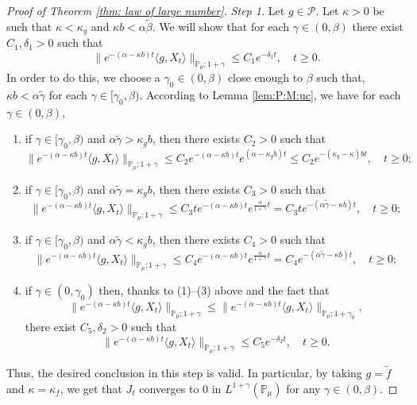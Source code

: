 \documentclass[12pt,a4paper]{amsart}
\theoremstyle{plain}
\theoremstyle{definition}
\numberwithin{equation}{section}
\begin{document}
\begin{proof}[Proof of Theorem \ref{thm: law of large number}]
\emph{Step 1.} Let $g\in \mathcal P$.
Let $\kappa > 0$ be such that $\kappa < \kappa_g$ and $\kappa b < \alpha \tilde \beta$.
We will show that for each $\gamma \in (0,\beta)$ there exist $C_1,\delta_1 > 0$ such that
\[
	\|e^{-(\alpha - \kappa b)t} \langle g, X_t\rangle\|_{\mathbb P_\mu;1+\gamma}
	\leq C_1 e^{-\delta_1 t},
	\quad t\geq 0.
\]
In order to do this, we choose a $\gamma_0 \in (0,\beta)$ close enough to $\beta$ such that, $\kappa b< \alpha \tilde \gamma$ for each $\gamma \in [\gamma_0, \beta)$.
According to Lemma \ref{lem:P:M:uc}, we have for each $\gamma \in (0,\beta)$,
\begin{enumerate}
\item
	if $\gamma \in [\gamma_0, \beta)$ and $\alpha\tilde \gamma> \kappa_g b$, then there exists $C_2>0$ such that
  \[
    \|e^{-(\alpha - \kappa b)t} \langle g, X_t\rangle\|_{\mathbb P_\mu;1+\gamma}
    \leq C_2 e^{-(\alpha-\kappa b)t}e^{(\alpha-\kappa_g b)t}
    \leq C_2  e^{-(\kappa_g - \kappa )bt},
    \quad t\geq 0;
  \]
\item
	if $\gamma \in [\gamma_0, \beta)$ and $\alpha\tilde \gamma=\kappa_g b$, then there exists $C_3>0$ such that
  \[
    \|e^{-(\alpha - \kappa b)t} \langle g, X_t\rangle\|_{\mathbb P_\mu;1+\gamma}
    \leq C_3 t e^{-(\alpha - \kappa b)t}e^{\frac{\alpha}{1+\gamma}t}
    = C_3 t e^{-(\alpha \tilde \gamma - \kappa b)t},
    \quad t\geq 0;
  \]
\item
	if $\gamma \in [\gamma_0, \beta)$ and $\alpha\tilde \gamma < \kappa_g b$, then there exists $C_4>0$ such that
  \[
    \|e^{-(\alpha - \kappa b)t} \langle g, X_t\rangle\|_{\mathbb{P}_{\mu};1+\gamma}
    \leq C_4  e^{-(\alpha - \kappa b)t}e^{\frac{\alpha}{1+\gamma}t}
    = C_4  e^{-(\alpha \tilde \gamma - \kappa b)t},
    \quad t\geq 0;
  \]
\item
	if $\gamma \in (0,\gamma_0)$ then, thanks to (1)--(3) above and the fact that \[\|e^{-(\alpha - \kappa b)t} \langle g, X_t\rangle\|_{\mathbb{P}_{\mu};1+\gamma}
    \leq \|e^{-(\alpha - \kappa b)t} \langle g, X_t\rangle\|_{\mathbb{P}_{\mu};1+\gamma_0},\] there exist $C_5, \delta_2 >0$ such that
  \[
    \|e^{-(\alpha - \kappa b)t} \langle g, X_t\rangle\|_{\mathbb{P}_{\mu};1+\gamma}
    \leq C_5e^{-\delta_2 t},
    \quad t\geq 0.
  \]
\end{enumerate}
Thus, the desired conclusion in this step is valid.
In particular, by taking $g = \widetilde f$ and $\kappa = \kappa_f$, we get that $J_t$ converges to $0$ in $L^{1+\gamma}(\mathbb{P}_{\mu})$ for any $\gamma\in(0,\beta)$.


\end{proof}
\end{document}
